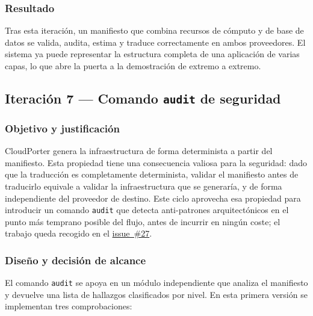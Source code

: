 \subsubsection{Resultado}

Tras esta iteración, un manifiesto que combina recursos de cómputo y de base de datos se valida,
audita, estima y traduce correctamente en ambos proveedores. El sistema ya puede representar la
estructura completa de una aplicación de varias capas, lo que abre la puerta a la demostración
de extremo a extremo.

\subsection{Iteración 7 — Comando \texttt{audit} de seguridad}
\label{sec:iter7}

\subsubsection{Objetivo y justificación}

CloudPorter genera la infraestructura de forma determinista a partir del manifiesto. Esta
propiedad tiene una consecuencia valiosa para la seguridad: dado que la traducción es
completamente determinista, validar el manifiesto antes de traducirlo equivale a validar la
infraestructura que se generaría, y de forma independiente del proveedor de destino. Este ciclo
aprovecha esa propiedad para introducir un comando \texttt{audit} que detecta anti-patrones
arquitectónicos en el punto más temprano posible del flujo, antes de incurrir en ningún coste;
el trabajo queda recogido en el \href{https://github.com/lucpez/cloudporter/issues/27}{issue~\#27}.

\subsubsection{Diseño y decisión de alcance}

El comando \texttt{audit} se apoya en un módulo independiente que analiza el manifiesto y
devuelve una lista de hallazgos clasificados por nivel. En esta primera versión se implementan
tres comprobaciones:


